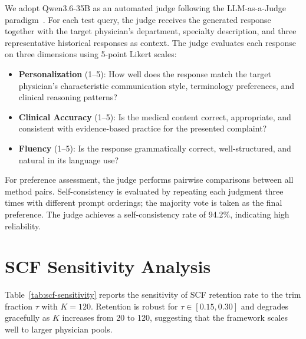 We adopt Qwen3.6-35B as an automated judge following the LLM-as-a-Judge paradigm~\cite{NEURIPS2023_91f18a12}. For each test query, the judge receives the generated response together with the target physician's department, specialty description, and three representative historical responses as context. The judge evaluates each response on three dimensions using 5-point Likert scales:

\begin{itemize}
\item \textbf{Personalization} (1--5): How well does the response match the target physician's characteristic communication style, terminology preferences, and clinical reasoning patterns?
\item \textbf{Clinical Accuracy} (1--5): Is the medical content correct, appropriate, and consistent with evidence-based practice for the presented complaint?
\item \textbf{Fluency} (1--5): Is the response grammatically correct, well-structured, and natural in its language use?
\end{itemize}

For preference assessment, the judge performs pairwise comparisons between all method pairs. Self-consistency is evaluated by repeating each judgment three times with different prompt orderings; the majority vote is taken as the final preference. The judge achieves a self-consistency rate of 94.2\%, indicating high reliability. 

\section{SCF Sensitivity Analysis}

Table~\ref{tab:scf-sensitivity} reports the sensitivity of SCF retention rate to the trim fraction $\tau$ with $K=120$. Retention is robust for $\tau \in [0.15, 0.30]$ and degrades gracefully as $K$ increases from 20 to 120, suggesting that the framework scales well to larger physician pools.

